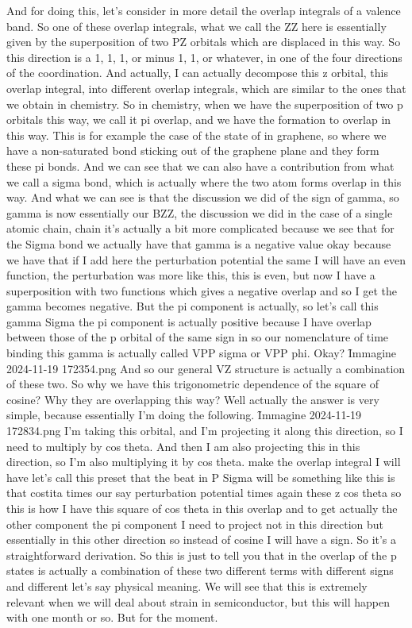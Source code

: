 And for doing this, let's consider in more detail the overlap integrals of a valence band. So one of these overlap integrals, what we call the ZZ here is essentially given by the superposition of two PZ orbitals which are displaced in this way. So this direction is a 1, 1, 1, or minus 1, 1, or whatever, in one of the four directions of the coordination. And actually, I can actually decompose this z orbital, this overlap integral, into different overlap integrals, which are similar to the ones that we obtain in chemistry. So in chemistry, when we have the superposition of two p orbitals this way, we call it pi overlap, and we have the formation to overlap in this way. This is for example the case of the state of in graphene, so where we have a non-saturated bond sticking out of the graphene plane and they form these pi bonds. And we can see that we can also have a contribution from what we call a sigma bond, which is actually where the two atom forms overlap in this way. And what we can see is that the discussion we did of the sign of gamma, so gamma is now essentially our BZZ, the discussion we did in the case of a single atomic chain, chain it's actually a bit more complicated because we see that for the Sigma bond we actually have that gamma is a negative value okay because we have that if I add here the perturbation potential the same I will have an even function, the perturbation was more like this, this is even, but now I have a superposition with two functions which gives a negative overlap and so I get the gamma becomes negative. But the pi component is actually, so let's call this gamma Sigma the pi component is actually positive because I have overlap between those of the p orbital of the same sign in so our nomenclature of time binding this gamma is actually called VPP sigma or VPP phi. Okay?
\f{Immagine 2024-11-19 172354.png}
And so our general VZ structure is actually a combination of these two. So why we have this trigonometric dependence of the square of cosine? Why they are overlapping this way? Well actually the answer is very simple, because essentially I'm doing the following.
\f{Immagine 2024-11-19 172834.png}
I'm taking this orbital, and I'm projecting it along this direction, so I need to multiply by cos theta. And then I am also projecting this in this direction, so I'm also multiplying it by cos theta. make the overlap integral I will have let's call this preset that the beat in P Sigma will be something like this is that costita times our say perturbation potential times again these z cos theta so this is how I have this square of cos theta in this overlap and to get actually the other component the pi component I need to project not in this direction but essentially in this other direction so instead of cosine I will have a sign. So it's a straightforward derivation. So this is just to tell you that in the overlap of the p states is actually a combination of these two different terms with different signs and different let's say physical meaning. We will see that this is extremely relevant when we will deal about strain in semiconductor, but this will happen with one month or so. But for the moment.
